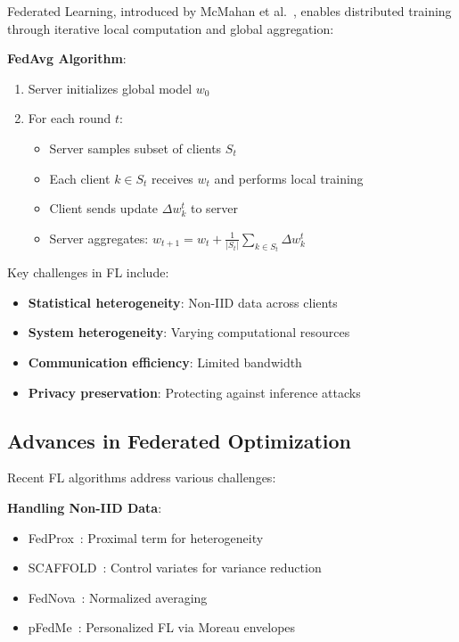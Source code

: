 \documentclass[journal]{IEEEtran}
\begin{document}
Federated Learning, introduced by McMahan et al.~\cite{mcmahan2017fedavg}, enables distributed training through iterative local computation and global aggregation:

\textbf{FedAvg Algorithm}:
\begin{enumerate}
\item Server initializes global model $w_0$
\item For each round $t$:
   \begin{itemize}
   \item Server samples subset of clients $S_t$
   \item Each client $k \in S_t$ receives $w_t$ and performs local training
   \item Client sends update $\Delta w_k^t$ to server
   \item Server aggregates: $w_{t+1} = w_t + \frac{1}{|S_t|}\sum_{k \in S_t} \Delta w_k^t$
   \end{itemize}
\end{enumerate}

Key challenges in FL include:
\begin{itemize}
\item \textbf{Statistical heterogeneity}: Non-IID data across clients
\item \textbf{System heterogeneity}: Varying computational resources
\item \textbf{Communication efficiency}: Limited bandwidth
\item \textbf{Privacy preservation}: Protecting against inference attacks
\end{itemize}

\subsection{Advances in Federated Optimization}

Recent FL algorithms address various challenges:

\textbf{Handling Non-IID Data}:
\begin{itemize}
\item FedProx~\cite{li2020fedprox}: Proximal term for heterogeneity
\item SCAFFOLD~\cite{karimireddy2020scaffold}: Control variates for variance reduction
\item FedNova~\cite{wang2020fednova}: Normalized averaging
\item pFedMe~\cite{dinh2020pfedme}: Personalized FL via Moreau envelopes
\end{itemize}
\end{document}
